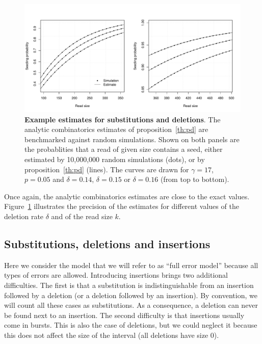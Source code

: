 \documentclass{article}
\begin{document}
\begin{figure}[h]
\centering
\includegraphics[scale=0.445]{simulpdel.pdf}
\caption{\textbf{Example estimates for substitutions and deletions}. The
analytic combinatorics estimates of proposition~\ref{th:pd} are
benchmarked against random simulations. Shown on both panels are the
probablities that a read of given size contains a seed, either estimated
by 10,000,000 random simulations (dots), or by proposition~\ref{th:pd}
(lines). The curves are drawn for $\gamma=17$, $p=0.05$ and $\delta=0.14$,
$\delta=0.15$ or $\delta=0.16$ (from top to bottom).}
\label{fig:simulpdel}
\end{figure}

Once again, the analytic combinatorics estimates are close to the exact
values. Figure~\ref{fig:simulpdel} illustrates the precision of the
estimates for different values of the deletion rate $\delta$ and of the
read size $k$.




\subsection{Substitutions, deletions and insertions}
\label{sec:insertions}

Here we consider the model that we will refer to as ``full error model''
because all types of errors are allowed. Introducing insertions brings two
additional difficulties. The first is that a substitution is
indistinguishable from an insertion followed by a deletion (or a deletion
followed by an insertion). By convention, we will count all these cases as
substitutions. As a consequence, a deletion can never be found next to an
insertion. The second difficulty is that insertions usually come in
bursts. This is also the case of deletions, but we could neglect it
because this does not affect the size of the interval (all deletions have
size $0$). 
\end{document}

